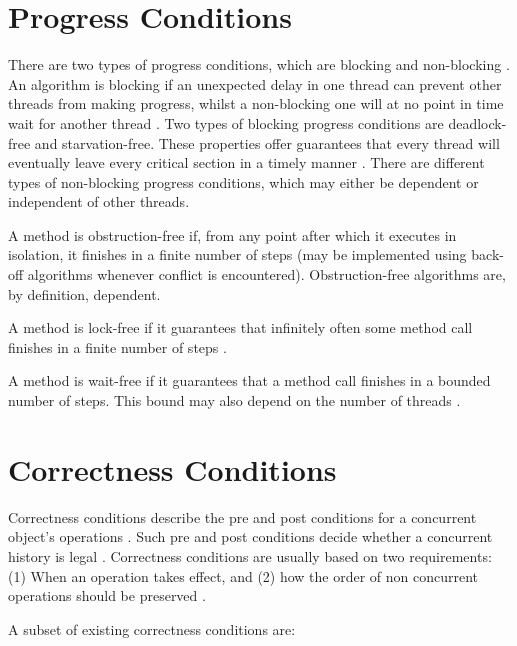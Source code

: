 \section{Progress Conditions}
There are two types of progress conditions, which are blocking and non-blocking \cite[Chapter~3.7]{herlihy2020art}. An algorithm is blocking if an unexpected delay in one thread can prevent other threads from making progress, whilst a non-blocking one will at no point in time wait for another thread \cite[Chapter~3.7]{herlihy2020art}. Two types of blocking progress conditions are deadlock-free and starvation-free. These properties offer guarantees that every thread will eventually leave every critical section in a timely manner \cite[Chapter~3.7.1]{herlihy2020art}. There are different types of non-blocking progress conditions, which may either be dependent or independent of other threads. 

A method is obstruction-free if, from any point after which it executes in isolation, it finishes in a finite number of steps (may be implemented using back-off algorithms whenever conflict is encountered)\cite{herlihy2020art,herlihy2003obstruction}. Obstruction-free algorithms are, by definition, dependent.

A method is lock-free if it guarantees that infinitely often some method call finishes in a finite number of steps \cite{herlihy2020art}.

A method is wait-free if it guarantees that a method call finishes in a bounded number of steps. This bound may also depend on the number of threads \cite{herlihy2020art}.

\section{Correctness Conditions}

Correctness conditions describe the pre and post conditions for a concurrent object's operations \cite{herlihy2020art}. Such pre and post conditions decide whether a concurrent history is legal \cite{herlihy1990linearizability}. Correctness conditions are usually based on two requirements: (1) When an operation takes effect, and (2) how the order of non concurrent operations should be preserved \cite{herlihy1990linearizability}.

A subset of existing correctness conditions are:

